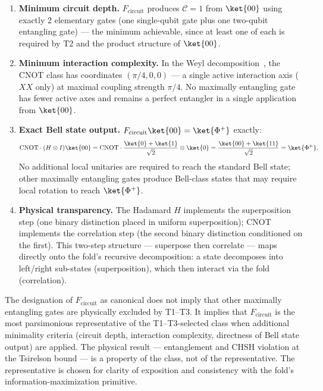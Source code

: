 \begin{enumerate}

\item \textbf{Minimum circuit depth.}
$F_{\mathrm{circuit}}$ produces $\mathcal{C}=1$ from $\ket{00}$ using
exactly 2 elementary gates (one single-qubit gate plus one two-qubit
entangling gate) --- the minimum achievable, since at least one of each
is required by T2 and the product structure of $\ket{00}$.

\item \textbf{Minimum interaction complexity.}
In the Weyl decomposition~\cite{Zhang2003}, the CNOT class has
coordinates $(\pi/4, 0, 0)$ --- a single active interaction axis
($XX$ only) at maximal coupling strength $\pi/4$. No maximally
entangling gate has fewer active axes and remains a perfect entangler
in a single application from $\ket{00}$.

\item \textbf{Exact Bell state output.}
$F_{\mathrm{circuit}}\ket{00} = \ket{\Phi^+}$ exactly:
\begin{equation}
    \mathrm{CNOT}\cdot(H\otimes I)\ket{00}
    = \mathrm{CNOT}\cdot\frac{\ket{0}+\ket{1}}{\sqrt{2}}\otimes\ket{0}
    = \frac{\ket{00}+\ket{11}}{\sqrt{2}}
    = \ket{\Phi^+}.
    \label{eq:H_CNOT_output}
\end{equation}
No additional local unitaries are required to reach the standard Bell
state; other maximally entangling gates produce Bell-class states
that may require local rotation to reach $\ket{\Phi^+}$.

\item \textbf{Physical transparency.}
The Hadamard $H$ implements the superposition step (one binary
distinction placed in uniform superposition); CNOT implements the
correlation step (the second binary distinction conditioned on the
first). This two-step structure --- superpose then correlate ---
maps directly onto the fold's recursive decomposition: a state
decomposes into left/right sub-states (superposition), which then
interact via the fold (correlation).

\end{enumerate}

\begin{remark}
\label{rem:canonical_caveat}
The designation of $F_{\mathrm{circuit}}$ as canonical does not imply
that other maximally entangling gates are physically excluded by
T1--T3. It implies that $F_{\mathrm{circuit}}$ is the most
parsimonious representative of the T1--T3-selected class when
additional minimality criteria (circuit depth, interaction
complexity, directness of Bell state output) are applied. The
physical result --- entanglement and CHSH violation at the Tsirelson
bound --- is a property of the class, not of the representative.
The representative is chosen for clarity of exposition and
consistency with the fold's information-maximization primitive.
\end{remark}

